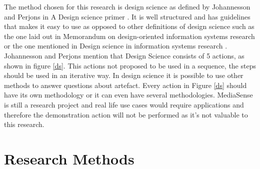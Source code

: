 The method chosen for this research is design science as defined by Johannesson and Perjons in A Design science primer \cite{johannesson2012design}. It is well structured and has guidelines that makes it easy to use as opposed to other definitions of design science such as the one laid out in Memorandum on design-oriented information systems research \cite{osterle2010memorandum} or the one mentioned in Design science in information systems research \cite{hevner2004design}. Johannesson and Perjons mention that Design Science consists of 5 actions, as shown in figure \ref{ds}. This actions not proposed to be used in a sequence, the steps should be used in an iterative way. In design science it is possible to use other methods to answer questions about artefact. Every action in Figure \ref{ds} should have its own methodology or it can even have several methodologies. MediaSense is still a research project and real life use cases would require applications and therefore the demonstration action will not be performed as it's not valuable to this research.

\section{Research Methods}





